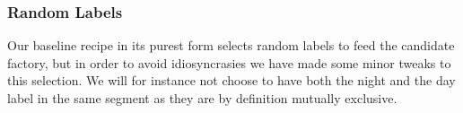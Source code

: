 \subsubsection{Random Labels}
% 
Our baseline recipe in its purest form selects random labels to feed the candidate factory, but in order to avoid idiosyncrasies we have made some minor tweaks to this selection. We will for instance not choose to have both the night and the day label in the same segment as they are by definition mutually exclusive. 
%
